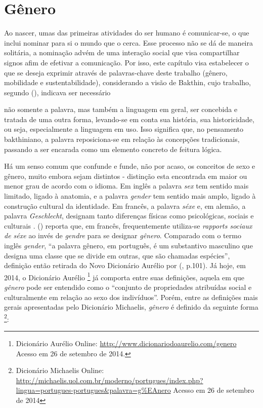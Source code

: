 \section{Gênero}

Ao nascer, umas das primeiras atividades do ser humano é comunicar-se, o que inclui nominar para si o mundo que o cerca. Esse processo não se dá de maneira solitária, a nominação advém de uma interação social que visa compartilhar signos afim de efetivar a comunicação. Por isso, este capítulo visa estabelecer o que se deseja exprimir através de palavras-chave deste trabalho (gênero, mobilidade e sustentabilidade), considerando a visão de Bakthin, cujo trabalho, segundo  (\citeyear{STELLA2005}), indicava ser necessário

\begin{citacao}
não somente a palavra, mas também a linguagem em geral, ser concebida e tratada de uma outra forma, levando-se em conta sua história, sua historicidade, ou seja, especialmente a linguagem em uso. Isso significa que, no pensamento bakthiniano, a palavra reposiciona-se em relação às concepções tradicionais, passando a ser encarada como um elemento concreto de feitura lógica.
\end{citacao}

Há um senso comum que confunde e funde, não por acaso, os conceitos de sexo e gênero, muito embora sejam distintos - distinção esta encontrada em maior ou menor grau de acordo com o idioma. Em inglês a palavra \emph{sex} tem sentido mais limitado, ligado à anatomia, e a palavra \emph{gender} tem sentido mais amplo, ligado à construção cultural da identidade. Em francês, a palavra \emph{séxe} e, em alemão, a palavra \emph{Geschlecht}, designam tanto diferenças físicas como psicológicas, sociais e culturais \cite{FRAISSE2001}.  (\citeyear{MORAES1998}) reporta que, em francês, frequentemente utiliza-se \emph{rapports sociaux de séxe} ao invés de \emph{gendre} para se designar \emph{gênero}. Comparado com o termo inglês \emph{gender}, ``a palavra gênero, em português, é um substantivo masculino que designa uma classe que se divide em outras, que são chamadas espécies'', definição então retirada do Novo Dicionário Aurélio por  (\citeyear{MORAES1998}, p.101).
Já hoje, em 2014, o Dicionário Aurélio
\footnote{Dicionário Aurélio Online: \url{http://www.dicionariodoaurelio.com/genero} Acesso em 26 de setembro de 2014.}
já comporta entre suas definições, aquela em que \emph{gênero} pode ser entendido como o ``conjunto de propriedades atribuídas social e culturalmente em relação ao sexo dos indivíduos''.
Porém, entre as definições mais gerais apresentadas pelo Dicionário Michaelis, \emph{gênero} é definido da seguinte forma
\footnote{Dicionário Michaelis Online: \url{http://michaelis.uol.com.br/moderno/portugues/index.php?lingua=portugues-portugues&palavra=g\%EAnero} Acesso em 26 de setembro de 2014}:

